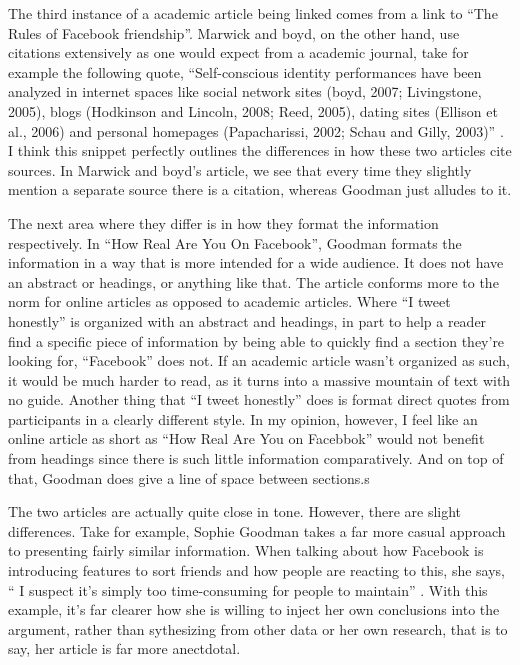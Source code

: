 \documentclass[12pt]{article}
\begin{document}
\begin{doublespace}
        The third instance of a academic article being linked comes from a link to ``The Rules of Facebook friendship''. 
        Marwick and boyd, on the other hand, use citations extensively as one would expect from a academic journal, take for example the following quote,
        ``Self-conscious identity performances have been analyzed in internet spaces like social network sites (boyd, 2007; Livingstone, 2005), blogs (Hodkinson and Lincoln, 2008; Reed, 2005), 
        dating sites (Ellison et al., 2006) and personal homepages (Papacharissi, 2002; Schau and Gilly, 2003)'' \autocite[115]{tweet}.
        I think this snippet perfectly outlines the differences in how these two articles cite sources. In Marwick and boyd's article, we see that every time they slightly mention a separate source there is a citation, whereas Goodman just alludes to it.
    \par%
        The next area where they differ is in how they format the information respectively. In ``How Real Are You On Facebook'', Goodman formats the information in a way that is more intended for a wide audience.
        It does not have an abstract or headings, or anything like that. The article conforms more to the norm for online articles as opposed to academic articles.
        Where ``I tweet honestly'' is organized with an abstract and headings, in part to help a reader find a specific piece of information by being able to quickly find a section they're looking for, ``Facebook'' does not.
        If an academic article wasn't organized as such, it would be much harder to read, as it turns into a massive mountain of text with no guide. Another thing that ``I tweet honestly'' does is format direct quotes from participants in a clearly different style.
        In my opinion, however, I feel like an online article as short as ``How Real Are You on Facebbok'' would not benefit from headings since there is such little information comparatively. And on top of that, Goodman does give a line of space between sections.s
    \par%
        The two articles are actually quite close in tone. However, there are slight differences. Take for example, Sophie Goodman takes a far more casual approach to presenting fairly similar information.
        When talking about how Facebook is introducing features to sort friends and how people are reacting to this, she says, `` I suspect it's simply too time-consuming for people to maintain'' \autocite{facebook}.
        With this example, it's far clearer how she is willing to inject her own conclusions into the argument, rather than sythesizing from other data or her own research, that is to say, her article is far more anectdotal.

\end{doublespace}
\end{document}

